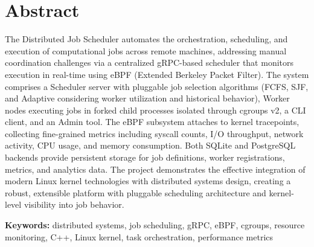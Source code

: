 \chapter*{Abstract}

The Distributed Job Scheduler automates the orchestration, scheduling, and execution of computational jobs across remote machines, addressing manual coordination challenges via a centralized gRPC-based scheduler that monitors execution in real-time using eBPF (Extended Berkeley Packet Filter). The system comprises a Scheduler server with pluggable job selection algorithms (FCFS, SJF, and Adaptive considering worker utilization and historical behavior), Worker nodes executing jobs in forked child processes isolated through cgroups v2, a CLI client, and an Admin tool. The eBPF subsystem attaches to kernel tracepoints, collecting fine-grained metrics including syscall counts, I/O throughput, network activity, CPU usage, and memory consumption. Both SQLite and PostgreSQL backends provide persistent storage for job definitions, worker registrations, metrics, and analytics data. The project demonstrates the effective integration of modern Linux kernel technologies with distributed systems design, creating a robust, extensible platform with pluggable scheduling architecture and kernel-level visibility into job behavior.

\vspace{1em}
\noindent\textbf{Keywords:} distributed systems, job scheduling, gRPC, eBPF, cgroups, resource monitoring, C++, Linux kernel, task orchestration, performance metrics

\clearpage

